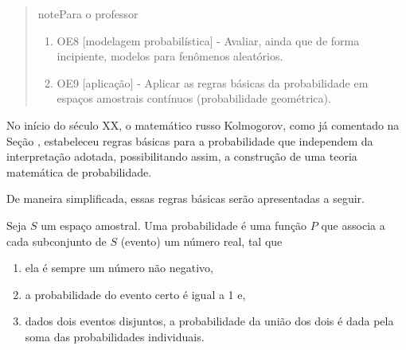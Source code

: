 \begin{quote}
\begin{sphinxadmonition}{note}{Para o professor}
\begin{enumerate}
\item {} 
OE8 {[}modelagem probabilística{]} - Avaliar, ainda que de forma incipiente, modelos para fenômenos aleatórios.

\item {} 
OE9 {[}aplicação{]} - Aplicar as regras básicas da probabilidade em espaços amostrais contínuos (probabilidade geométrica).

\end{enumerate}
\end{sphinxadmonition}
\end{quote}


\label{\detokenize{PE511-3:explorando-probabilidade-regras-basicas-e-propriedades}}\label{\detokenize{PE511-3:sec-regras-basicas}}\label{\detokenize{PE511-3::doc}}
No início do século XX, o matemático russo Kolmogorov, como já comentado na Seção {\hyperref[\detokenize{PE511-0:sec-conceitos-basicos}]{}}, estabeleceu regras básicas para a probabilidade que independem da interpretação adotada, possibilitando assim, a construção de uma teoria matemática de probabilidade.

De maneira simplificada, essas regras básicas serão apresentadas a seguir.

Seja \(S\) um espaço amostral. Uma probabilidade é uma função \(P\) que associa a cada subconjunto de \(S\) (evento)  um número real, tal que
\begin{enumerate}
\item {} 
ela é sempre um número não negativo,

\item {} 
a probabilidade do evento certo é igual a 1 e,

\item {} 
dados dois eventos disjuntos, a probabilidade da união dos dois é dada pela soma das probabilidades individuais.

\end{enumerate}

